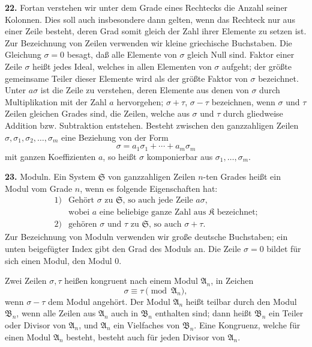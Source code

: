 \documentclass[11pt,a4paper]{article}
\newcommand{\K}{\mathfrak K}
\begin{document}
\textbf{22.} Fortan verstehen wir unter dem Grade eines Rechtecks die Anzahl seiner Kolonnen. Dies soll auch insbesondere dann gelten, wenn das Rechteck nur aus einer Zeile besteht, deren Grad somit gleich der Zahl ihrer Elemente zu setzen ist. Zur Bezeichnung von Zeilen verwenden wir kleine griechische Buchstaben. Die Gleichung \(\sigma=0\) besagt, daß alle Elemente von \(\sigma\) gleich Null sind. Faktor einer Zeile \(\sigma\) heißt jedes Ideal, welches in allen Elementen von \(\sigma\) aufgeht; der größte gemeinsame Teiler dieser Elemente wird als der größte Faktor von \(\sigma\) bezeichnet. Unter \(a\sigma\) ist die Zeile zu verstehen, deren Elemente aus denen von \(\sigma\) durch Multiplikation mit der Zahl \(a\) hervorgehen; \(\sigma+\tau\), \(\sigma-\tau\) bezeichnen, wenn \(\sigma\) und \(\tau\) Zeilen gleichen Grades sind, die Zeilen, welche aus \(\sigma\) und \(\tau\) durch gliedweise Addition bzw. Subtraktion entstehen. Besteht zwischen den ganzzahligen Zeilen \(\sigma,\sigma_1,\sigma_2,\ldots,\sigma_m\) eine Beziehung von der Form
\[
 \sigma=a_1\sigma_1+\cdots+a_m\sigma_m
\]
mit ganzen Koeffizienten \(a\), so heißt \(\sigma\) komponierbar aus \(\sigma_1,\ldots,\sigma_m\).

\textbf{23.} Moduln. Ein System \(\mathfrak S\) von ganzzahligen Zeilen \(n\)-ten Grades heißt ein Modul vom Grade \(n\), wenn es folgende Eigenschaften hat:
\[
\begin{array}{ll}
1)& \text{Gehört \(\sigma\) zu \(\mathfrak S\), so auch jede Zeile \(a\sigma\),}\\
& \text{wobei \(a\) eine beliebige ganze Zahl aus \(\K\) bezeichnet;}\\[2mm]
2)& \text{gehören \(\sigma\) und \(\tau\) zu \(\mathfrak S\), so auch \(\sigma+\tau\).}
\end{array}
\]
Zur Bezeichnung von Moduln verwenden wir große deutsche Buchstaben; ein unten beigefügter Index gibt den Grad des Moduls an. Die Zeile \(\sigma=0\) bildet für sich einen Modul, den Modul \(0\).

Zwei Zeilen \(\sigma,\tau\) heißen kongruent nach einem Modul \(\mathfrak A_n\), in Zeichen
\[
 \sigma\equiv\tau\pmod{\mathfrak A_n},
\]
wenn \(\sigma-\tau\) dem Modul angehört. Der Modul \(\mathfrak A_n\) heißt teilbar durch den Modul \(\mathfrak B_n\), wenn alle Zeilen aus \(\mathfrak A_n\) auch in \(\mathfrak B_n\) enthalten sind; dann heißt \(\mathfrak B_n\) ein Teiler oder Divisor von \(\mathfrak A_n\), und \(\mathfrak A_n\) ein Vielfaches von \(\mathfrak B_n\). Eine Kongruenz, welche für einen Modul \(\mathfrak A_n\) besteht, besteht auch für jeden Divisor von \(\mathfrak A_n\).
\end{document}
